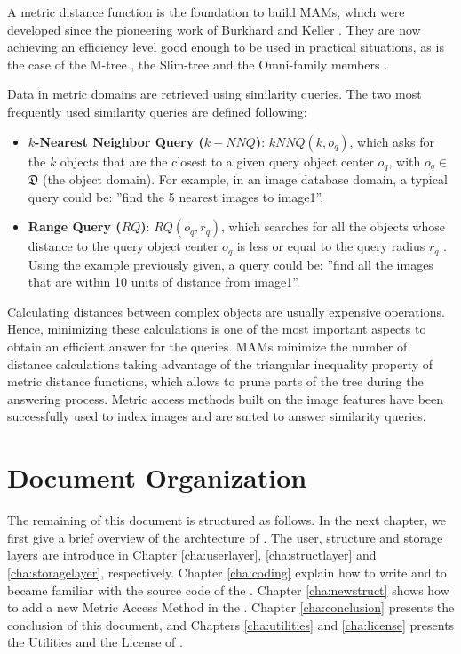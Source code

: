 	A metric distance function is the foundation to build MAMs, which were developed since the pioneering work of Burkhard and Keller \cite{Burkhard1973}. They are now achieving an efficiency level good enough to be used in practical situations, as is the case of the M-tree \cite{Ciaccia1997}, the Slim-tree \cite{Traina2000} and the Omni-family members \cite{Santos2001b}.

	Data in metric domains are retrieved using similarity queries. The two most frequently used similarity queries are defined following:
		
\begin{itemize}
	\item \textbf{$k$-Nearest Neighbor Query ($k-NNQ$)}: $kNNQ(k, o_q)$, which asks for the $k$ objects that are the closest to a given query object center $o_q$, with $o_q \in$ \textbf{$\mathfrak{D}$} (the object domain). For example, in an image database domain, a typical query could be: ''find the 5 nearest images to image1''.

	\item \textbf{Range Query ($RQ$)}: $RQ(o_q, r_q)$, which searches for all the objects whose distance to the query object center $o_q$ is less or equal to the query radius $r_q$ . Using the example previously given, a query could be: ''find all the images that are within 10 units of distance from image1''.
\end{itemize}

	Calculating distances between complex objects are usually expensive operations. Hence, minimizing these calculations is one of the most important aspects to obtain an efficient answer for the queries. MAMs minimize the number of distance calculations taking advantage of the triangular inequality property of metric distance functions, which allows to prune parts of the tree during the answering process. Metric access methods built on the image features have been successfully used to index images and are suited to answer similarity queries.

\section{Document Organization}

	The remaining of this document is structured as follows. In the next chapter, we first give a brief overview of the archtecture of \libname. The user, structure and storage layers are introduce in Chapter \ref{cha:userlayer}, \ref{cha:structlayer} and \ref{cha:storagelayer}, respectively. Chapter \ref{cha:coding} explain how to write and to became familiar with the source code of the \libname. Chapter \ref{cha:newstruct} shows how to add a new Metric Access Method in the \libname. Chapter \ref{cha:conclusion} presents the conclusion of this document, and Chapters \ref{cha:utilities} and \ref{cha:license} presents the Utilities and the License of \libname.